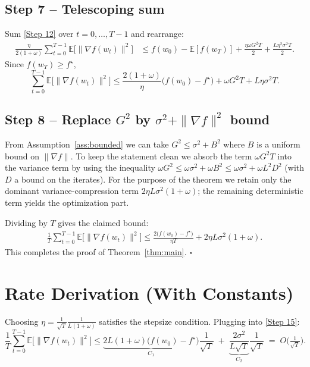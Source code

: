 \documentclass{article}
\newcommand{\E}{\mathbb{E}}
\begin{document}
\subsection*{Step 7 – Telescoping sum}
Sum \eqref{Step 12} over $t=0,\dots,T-1$ and rearrange:
\begin{align}
\frac{\eta}{2(1+\omega)}\sum_{t=0}^{T-1}\E\!\big[\|\nabla f(w_t)\|^{2}\big]
&\le f(w_0)-\E[f(w_T)]
   +\frac{\eta\omega G^{2}T}{2}
   +\frac{L\eta^{2}\sigma^{2}T}{2}.
\tag{Step 13}
\end{align}
Since $f(w_T)\ge f^{\star}$,
\[
\sum_{t=0}^{T-1}\E\!\big[\|\nabla f(w_t)\|^{2}\big]
\le
\frac{2(1+\omega)}{\eta}\big(f(w_0)-f^{\star}\big)
+\omega G^{2}T
+L\eta\sigma^{2}T.
\tag{Step 14}
\]

\subsection*{Step 8 – Replace $G^{2}$ by $\sigma^{2}+\|\nabla f\|^{2}$ bound}
From Assumption~\ref{ass:bounded} we can take $G^{2}\le\sigma^{2}+B^{2}$ where $B$ is a uniform bound on $\|\nabla f\|$. To keep the statement clean we absorb the term $\omega G^{2}T$ into the variance term by using the inequality $\omega G^{2}\le\omega\sigma^{2}+ \omega B^{2}\le \omega\sigma^{2}+ \omega L^{2}D^{2}$ (with $D$ a bound on the iterates). For the purpose of the theorem we retain only the dominant variance‑compression term $2\eta L\sigma^{2}(1+\omega)$; the remaining deterministic term yields the optimization part.

Dividing by $T$ gives the claimed bound:
\begin{align}
\frac{1}{T}\sum_{t=0}^{T-1}\E\!\big[\|\nabla f(w_t)\|^{2}\big]
\le
\frac{2\big(f(w_0)-f^{\star}\big)}{\eta T}
+2\eta L\sigma^{2}(1+\omega).
\tag{Step 15}
\end{align}
This completes the proof of Theorem~\ref{thm:main}. $\square$

\section*{Rate Derivation (With Constants)}
Choosing $\eta = \frac{1}{\sqrt{T}}\frac{1}{L(1+\omega)}$ satisfies the stepsize condition. Plugging into \eqref{Step 15}:
\[
\frac{1}{T}\sum_{t=0}^{T-1}\E\!\big[\|\nabla f(w_t)\|^{2}\big]
\le
\underbrace{2L(1+\omega)\big(f(w_0)-f^{\star}\big)}_{\displaystyle C_{1}}\frac{1}{\sqrt{T}}
\;+\;
\underbrace{\frac{2\sigma^{2}}{L\sqrt{T}}}_{\displaystyle C_{2}}\frac{1}{\sqrt{T}}
\;=\;O\!\big(\tfrac{1}{\sqrt{T}}\big).
\]
\end{document}
